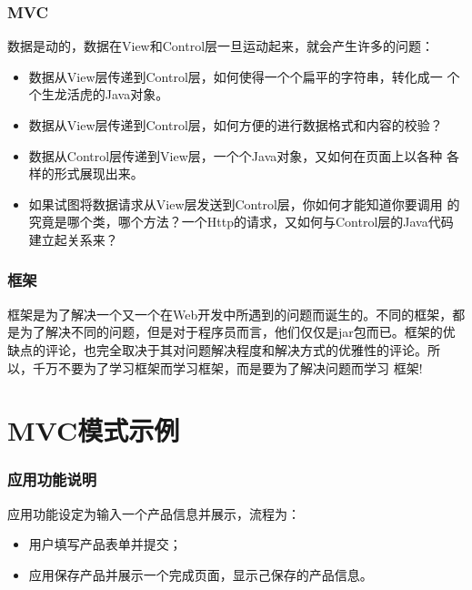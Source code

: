 \documentclass[hyperref={pdfpagelabels=false},compress,table]{beamer} %
\newcommand{\hei}{\CJKfamily{SimHei}}
\newcommand{\kai}{\CJKfamily{KaiTi}}
\def\Blue{\color{blue}}
\begin{document}
\begin{frame}[fragile] %
\frametitle{MVC}

数据是动的，数据在View和Control层一旦运动起来，就会产生许多的问题：

\begin{itemize}[<+-| alert@+>]\kai\small
\item 数据从View层传递到Control层，如何使得一个个扁平的字符串，转化成一
  个个生龙活虎的Java对象。
\item 数据从View层传递到Control层，如何方便的进行数据格式和内容的校验？ 
\item 数据从Control层传递到View层，一个个Java对象，又如何在页面上以各种
  各样的形式展现出来。
\item 如果试图将数据请求从View层发送到Control层，你如何才能知道你要调用
  的究竟是哪个类，哪个方法？一个Http的请求，又如何与Control层的Java代码
  建立起关系来？
\end{itemize}
\end{frame}

\begin{frame}[fragile] %
\frametitle{框架}

框架是为了解决一个又一个在Web开发中所遇到的问题而诞生的。不同的框架，都
是为了解决不同的问题，但是对于程序员而言，他们仅仅是jar包而已。框架的优
缺点的评论，也完全取决于其对问题解决程度和解决方式的优雅性的评论。所
以，{\hei\Blue 千万不要为了学习框架而学习框架，而是要为了解决问题而学习
  框架!}
\end{frame}

\section{MVC模式示例}

\begin{frame}[fragile]
  \frametitle{应用功能说明}

  应用功能设定为输入一个产品信息并展示，流程为：

  \begin{itemize}
  \item 用户填写产品表单并提交；
  \item 应用保存产品并展示一个完成页面，显示己保存的产品信息。
  \end{itemize}
  
\end{frame}
\end{document}
